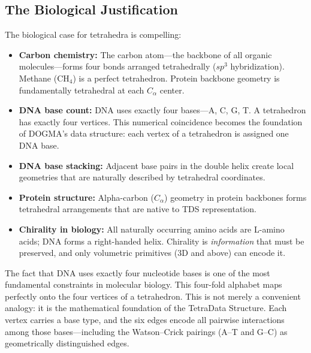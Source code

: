 \subsection{The Biological Justification}

The biological case for tetrahedra is compelling:

\begin{itemize}[leftmargin=1.8em]
  \item \textbf{Carbon chemistry:} The carbon atom---the backbone of all organic
        molecules---forms four bonds arranged tetrahedrally ($sp^3$ hybridization).
        Methane (CH$_4$) is a perfect tetrahedron. Protein backbone geometry is
        fundamentally tetrahedral at each $C_\alpha$ center.

  \item \textbf{DNA base count:} DNA uses exactly four bases---A, C, G, T. A
        tetrahedron has exactly four vertices. This numerical coincidence becomes
        the foundation of DOGMA's data structure: each vertex of a tetrahedron
        is assigned one DNA base.

  \item \textbf{DNA base stacking:} Adjacent base pairs in the double helix create
        local geometries that are naturally described by tetrahedral coordinates.

  \item \textbf{Protein structure:} Alpha-carbon ($C_\alpha$) geometry in protein
        backbones forms tetrahedral arrangements that are native to TDS
        representation.

  \item \textbf{Chirality in biology:} All naturally occurring amino acids are
        L-amino acids; DNA forms a right-handed helix. Chirality is
        \emph{information} that must be preserved, and only volumetric
        primitives (3D and above) can encode it.
\end{itemize}

\begin{bioinsight}
The fact that DNA uses exactly four nucleotide bases is one of the most
fundamental constraints in molecular biology. This four-fold alphabet maps
perfectly onto the four vertices of a tetrahedron. This is not merely a
convenient analogy: it is the mathematical foundation of the TetraData
Structure. Each vertex carries a base type, and the six edges encode all
pairwise interactions among those bases---including the Watson--Crick pairings
(A--T and G--C) as geometrically distinguished edges.
\end{bioinsight}

